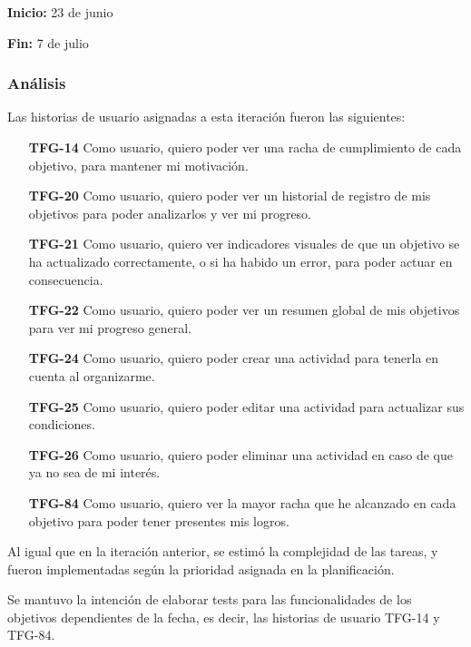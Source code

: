 \documentclass[10pt, a4paper]{aqademic}
\begin{document}
\textbf{Inicio:} 23 de junio

\textbf{Fin:} 7 de julio

\subsubsection{Análisis}

Las historias de usuario asignadas a esta iteración fueron las siguientes:

\begin{itemize}[leftmargin=16mm]
	\item [\textbf{TFG-14}] Como usuario, quiero poder ver una racha de cumplimiento de cada objetivo, para mantener mi motivación.
	
	\item [\textbf{TFG-20}] Como usuario, quiero poder ver un historial de registro de mis objetivos para poder analizarlos y ver mi progreso.
	
	\item [\textbf{TFG-21}] Como usuario, quiero ver indicadores visuales de que un objetivo se ha actualizado correctamente, o si ha habido un error, para poder actuar en consecuencia.
	
	\item [\textbf{TFG-22}] Como usuario, quiero poder ver un resumen global de mis objetivos para ver mi progreso general.
	
	\item [\textbf{TFG-24}] Como usuario, quiero poder crear una actividad para tenerla en cuenta al organizarme.
	
	\item [\textbf{TFG-25}] Como usuario, quiero poder editar una actividad para actualizar sus condiciones.
	
	\item [\textbf{TFG-26}] Como usuario, quiero poder eliminar una actividad en caso de que ya no sea de mi interés.
	
	\item [\textbf{TFG-84}] Como usuario, quiero ver la mayor racha que he alcanzado en cada objetivo para poder tener presentes mis logros.
\end{itemize}

Al igual que en la iteración anterior, se estimó la complejidad de las tareas, y fueron implementadas según la prioridad asignada en la planificación.

Se mantuvo la intención de elaborar tests para las funcionalidades de los objetivos dependientes de la fecha, es decir, las historias de usuario TFG-14 y TFG-84.
\end{document}
